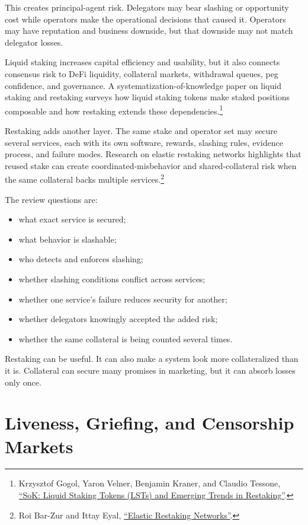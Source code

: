 This creates principal-agent risk. Delegators may bear slashing or opportunity cost while operators make the operational decisions that caused it. Operators may have reputation and business downside, but that downside may not match delegator losses.

Liquid staking increases capital efficiency and usability, but it also connects consensus risk to DeFi liquidity, collateral markets, withdrawal queues, peg confidence, and governance. A systematization-of-knowledge paper on liquid staking and restaking surveys how liquid staking tokens make staked positions composable and how restaking extends these dependencies.\footnote{Krzysztof Gogol, Yaron Velner, Benjamin Kraner, and Claudio Tessone, \href{https://arxiv.org/abs/2404.00644}{``SoK: Liquid Staking Tokens (LSTs) and Emerging Trends in Restaking''}.}

Restaking adds another layer. The same stake and operator set may secure several services, each with its own software, rewards, slashing rules, evidence process, and failure modes. Research on elastic restaking networks highlights that reused stake can create coordinated-misbehavior and shared-collateral risk when the same collateral backs multiple services.\footnote{Roi Bar-Zur and Ittay Eyal, \href{https://arxiv.org/abs/2503.00170}{``Elastic Restaking Networks''}.}

The review questions are:

\begin{itemize}
\item what exact service is secured;
\item what behavior is slashable;
\item who detects and enforces slashing;
\item whether slashing conditions conflict across services;
\item whether one service's failure reduces security for another;
\item whether delegators knowingly accepted the added risk;
\item whether the same collateral is being counted several times.
\end{itemize}

Restaking can be useful. It can also make a system look more collateralized than it is. Collateral can secure many promises in marketing, but it can absorb losses only once.

\section{Liveness, Griefing, and Censorship Markets}

